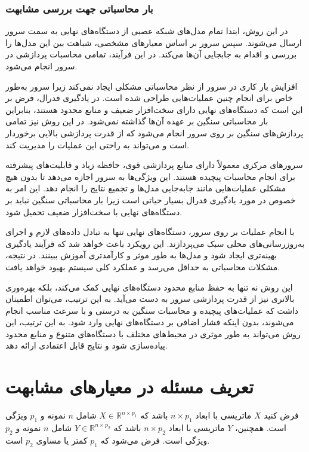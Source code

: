 \subsubsection*{بار محاسباتی جهت بررسی مشابهت}
در این روش، ابتدا تمام مدل‌های شبکه عصبی از دستگاه‌های نهایی به سمت سرور ارسال می‌شوند. سپس سرور بر اساس معیارهای مشخصی، شباهت بین این مدل‌ها را بررسی و اقدام به جابجایی آن‌ها می‌کند. در این فرآیند، تمامی محاسبات پردازشی در سرور انجام می‌شود.

افزایش بار کاری در سرور از نظر محاسباتی مشکلی ایجاد نمی‌کند زیرا سرور به‌طور خاص برای انجام چنین عملیات‌هایی طراحی شده است. در یادگیری فدرال، فرض بر این است که دستگاه‌های نهایی دارای سخت‌افزار ضعیف و منابع محدود هستند، بنابراین بار محاسباتی سنگین بر عهده آن‌ها گذاشته نمی‌شود. در این روش نیز تمامی پردازش‌های سنگین بر روی سرور انجام می‌شود که از قدرت پردازشی بالایی برخوردار است و می‌تواند به راحتی این عملیات را مدیریت کند.

سرورهای مرکزی معمولاً دارای منابع پردازشی قوی، حافظه زیاد و قابلیت‌های پیشرفته برای انجام محاسبات پیچیده هستند. این ویژگی‌ها به سرور اجازه می‌دهد تا بدون هیچ مشکلی عملیات‌هایی مانند جابه‌جایی مدل‌ها و تجمیع نتایج را انجام دهد. این امر به خصوص در مورد یادگیری فدرال بسیار حیاتی است زیرا بار محاسباتی سنگین نباید بر دستگاه‌های نهایی با سخت‌افزار ضعیف تحمیل شود.

با انجام عملیات بر روی سرور، دستگاه‌های نهایی تنها به تبادل داده‌های لازم و اجرای به‌روزرسانی‌های محلی سبک می‌پردازند. این رویکرد باعث خواهد شد که فرآیند یادگیری بهینه‌تری ایجاد شود و مدل‌ها به طور موثر و کارآمدتری آموزش ببینند. در نتیجه، مشکلات محاسباتی به حداقل می‌رسد و عملکرد کلی سیستم بهبود خواهد یافت.

این روش نه تنها به حفظ منابع محدود دستگاه‌های نهایی کمک می‌کند، بلکه بهره‌وری بالاتری نیز از قدرت پردازشی سرور به دست می‌آید. به این ترتیب، می‌توان اطمینان داشت که عملیات‌های پیچیده و محاسبات سنگین به درستی و با سرعت مناسب انجام می‌شوند، بدون اینکه فشار اضافی بر دستگاه‌های نهایی وارد شود. به این ترتیب، این روش می‌تواند به طور موثری در محیط‌های مختلف با دستگاه‌های متنوع و منابع محدود پیاده‌سازی شود و نتایج قابل اعتمادی ارائه دهد.


\section{تعریف مسئله در معیارهای مشابهت}
فرض کنید \( X \) ماتریسی با ابعاد \( n \times p_1 \) باشد که \( X \in \mathbb{R}^{n \times p_1} \) شامل \( n \) نمونه و \( p_1 \) ویژگی است. همچنین، \( Y \) ماتریسی با ابعاد \( n \times p_2 \) باشد که \( Y \in \mathbb{R}^{n \times p_2} \) شامل \( n \) نمونه و \( p_2 \) ویژگی است. فرض می‌شود که \( p_1 \) کمتر یا مساوی \( p_2 \) است.

